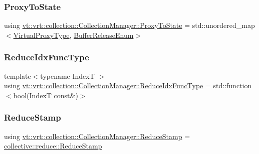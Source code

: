 \subsubsection{\texorpdfstring{Proxy\+To\+State}{ProxyToState}}
{\footnotesize\ttfamily using \hyperlink{structvt_1_1vrt_1_1collection_1_1_collection_manager_a47acf9cd5a988ba197fbef5097f75dde}{vt\+::vrt\+::collection\+::\+Collection\+Manager\+::\+Proxy\+To\+State} =  std\+::unordered\+\_\+map$<$\hyperlink{namespacevt_a1b417dd5d684f045bb58a0ede70045ac}{Virtual\+Proxy\+Type}, \hyperlink{namespacevt_1_1vrt_1_1collection_a2545006e681bacc1f00be9d5d6bdc8fa}{Buffer\+Release\+Enum}$>$\hspace{0.3cm}{\ttfamily [private]}}

\mbox{\label{structvt_1_1vrt_1_1collection_1_1_collection_manager_a47a3227ae0195c15187e8dc8762f66c4}} 
\subsubsection{\texorpdfstring{Reduce\+Idx\+Func\+Type}{ReduceIdxFuncType}}
{\footnotesize\ttfamily template$<$typename IndexT $>$ \\
using \hyperlink{structvt_1_1vrt_1_1collection_1_1_collection_manager_a47a3227ae0195c15187e8dc8762f66c4}{vt\+::vrt\+::collection\+::\+Collection\+Manager\+::\+Reduce\+Idx\+Func\+Type} =  std\+::function$<$bool(IndexT const\&)$>$}

\mbox{\label{structvt_1_1vrt_1_1collection_1_1_collection_manager_ae8aac19e0ae07e9225142e5880eac830}} 
\subsubsection{\texorpdfstring{Reduce\+Stamp}{ReduceStamp}}
{\footnotesize\ttfamily using \hyperlink{structvt_1_1vrt_1_1collection_1_1_collection_manager_ae8aac19e0ae07e9225142e5880eac830}{vt\+::vrt\+::collection\+::\+Collection\+Manager\+::\+Reduce\+Stamp} =  \hyperlink{namespacevt_1_1collective_1_1reduce_a7b7cb3021ac5654d92825d9fab0250b2}{collective\+::reduce\+::\+Reduce\+Stamp}}

